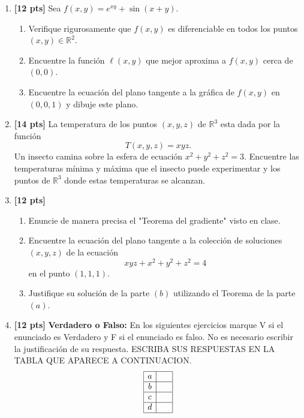\documentclass[12pt]{article}
\newcommand{\RR}{\mathbb{R}}
\begin{document}
\begin{enumerate}
\item {\bf [12 pts]} Sea $f(x,y)=e^{xy}+\sin(x+y)$.
\begin{enumerate}
\item  Verifique rigurosamente que $f(x,y)$ es diferenciable en todos los puntos $(x,y)\in \RR^2$.
\item Encuentre la funci\'on $\ell(x,y)$ que mejor aproxima a $f(x,y)$ cerca de $(0,0)$.
\item Encuentre la ecuaci\'on del plano tangente a la gr\'afica de $f(x,y)$ en $(0,0,1)$ y dibuje este plano.
\end{enumerate}

\newpage

\item {\bf [14 pts]} La temperatura de los puntos $(x,y,z)$ de $\RR^3$ esta dada por la funci\'on
\[T(x,y,z)= xyz.\] Un insecto camina sobre la esfera de ecuaci\'on $x^2+y^2+z^2=3$. Encuentre las temperaturas m\'inima y m\'axima que el insecto puede experimentar y los puntos de $\RR^3$ donde estas temperaturas se alcanzan.

\newpage
\item {\bf [12 pts]} \begin{enumerate}
\item Enuncie de manera precisa el "Teorema del gradiente" visto en clase.
\item Encuentre la ecuaci\'on del plano tangente a la colecci\'on de soluciones $(x,y,z)$ de la ecuaci\'on
\[xyz+x^2+y^2+z^2=4\]
en el punto $(1,1,1)$.
\item Justifique su soluci\'on de la parte $(b)$ utilizando el Teorema de la parte $(a)$.
\end{enumerate}


\newpage

\item {\bf [12 pts]} {\bf Verdadero o Falso:} En los siguientes ejercicios marque V si el enunciado es Verdadero y F si el enunciado es falso. No es necesario escribir la justificaci\'on de su respuesta. ESCRIBA SUS RESPUESTAS EN LA TABLA QUE APARECE A CONTINUACION.
\[
\begin{array}{|c|cc|}
\hline
a & & \\
\hline
b & & \\
\hline
c & & \\
\hline
d & & \\
\hline
\end{array}
\]




\end{enumerate}
\end{document}
